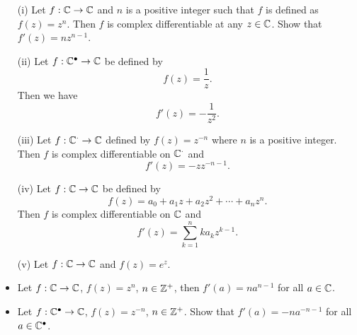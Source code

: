\documentclass[a4paper]{report}
\begin{document}
\begin{eg}
   \begin{enumerate}
       \item[(i)] Let \( f: \mathbb{C} \to \mathbb{C}  \) and \( n  \) is a positive integer such that \( f \) is defined as \( f(z) = z^{n} \). Then \( f  \) is complex differentiable at any \( z \in \mathbb{C}  \). Show that \( f'(z) = n z^{n-1} \).
        \item[(ii)] Let \( f: \mathbb{C}^{\bullet} \to \mathbb{C}  \) be defined by 
            \[  f(z) = \frac{ 1 }{ z }. \]
            Then we have 
            \[  f'(z) = - \frac{ 1 }{ z^{2} }. \]
        \item[(iii)] Let \( f: \mathbb{C}^{\cdot} \to \mathbb{C}  \) defined by \( f(z) = z^{-n} \) where \(  n \) is a positive integer. Then \( f  \) is complex differentiable on \( \mathbb{C}^{\cdot} \) and
            \[  f'(z) = -z z^{-n-1}. \]
        \item[(iv)] Let \( f: \mathbb{C} \to \mathbb{C}  \) be defined by
            \[  f(z) = {a}_{0} + {a}_{1}z + {a}_{2} z^{2} + \cdots + {a}_{n} z^{n}. \]
            Then \( f  \) is complex differentiable on \( \mathbb{C}  \) and 
            \[  f'(z) = \sum_{ k=1  }^{ n } k {a}_{k} z^{k-1}. \]
        \item[(v)] Let \( f: \mathbb{C} \to \mathbb{C}  \) and \( f(z) = e^{z} \).
   \end{enumerate} 
\end{eg}

\begin{problem}
    \begin{itemize}
        \item Let \( f: \mathbb{C} \to \mathbb{C}  \), \( f(z) = z^{n} \), \( n \in \mathbb{Z}^{+}  \), then \( f'(a) = n a^{n-1}  \) for all \( a \in \mathbb{C}  \).
        \item Let \( f: \mathbb{C}^{\bullet} \to \mathbb{C}  \), \( f(z) = z^{-n} \), \( n \in \mathbb{Z}^{+} \). Show that \( f'(a) = -n a^{-n-1} \) for all \( a \in \mathbb{C}^{\bullet} \).
    \end{itemize}
\end{problem}
\end{document}
